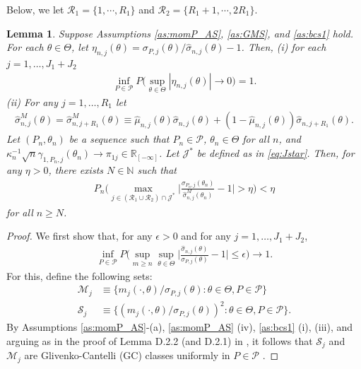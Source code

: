 \documentclass[letterpaper,11pt]{article}
\theoremstyle{myplain}
\newtheorem{lemma}{Lemma}[section]
\theoremstyle{mydefinition}
\theoremstyle{myremark}
\renewcommand{\cite}{\citet}
\newcommand{\R}{\mathbb{R}}
\newcommand{\dsM}{\mathcal{M}}
\newcommand{\gcM}{\mathcal{S}}
\numberwithin{equation}{section}
\numberwithin{figure}{section}
\begin{document}
\begin{appendices}
Below, we let $\mathcal R_1=\{1,\cdots,R_1\}$ and $\mathcal R_2=\{R_1+1,\cdots,2R_1\}.$
\begin{lemma}\label{lem:eta_conv}
	Suppose Assumptions \ref{as:momP_AS}, \ref{as:GMS}, and \ref{as:bcs1} hold. For each $\theta\in\Theta$, let $\eta_{n,j}(\theta)=\sigma_{P,j}(\theta)/\hat\sigma_{n,j}(\theta)-1$. Then, (i) for each $j=1,\dots,J_1+J_2$
\begin{align}
	\inf_{P\in\mathcal P}P
	\Big(\sup_{\theta\in\Theta}|\eta_{n,j}(\theta)|
	\to 0\Big)=1.
\end{align}	
(ii)
For any $j=1,\dots,R_1$ 
let
\begin{align}
\hat \sigma_{n,j}^M(\theta)=\hat \sigma_{n,j+R_1}^M(\theta)\equiv\hat \mu_{n,j}(\theta)\hat\sigma_{n,j}(\theta)+(1-\hat \mu_{n,j}(\theta))\hat\sigma_{n,j+R_1}(\theta). \label{eq:def_hat_sigma_M}
\end{align} 
Let $(P_n,\theta_n)$ be a sequence such that $P_n\in\mathcal P$, $\theta_n\in\Theta$ for all $n$, and $\kappa_n^{-1}\sqrt{n}\gamma_{1,P_n,j}(\theta_n) \to \pi_{1j} \in \R_{[-\infty]}$. Let $\mathcal J^*$ be defined as in \eqref{eq:Jstar}.
Then, for any $\eta>0$, there exists $N\in\mathbb N$ such that
\begin{align}
	P_n\Big(\max_{j\in(\mathcal R_1\cup \mathcal R_2)\cap\mathcal J^*}\Big|\frac{\sigma_{P_n,j}(\theta_n)}{\hat\sigma^M_{n,j}(\theta_n)}-1\Big|>\eta\Big)<\eta
\end{align}
for all  $n\ge N$.





\end{lemma}

\begin{proof}


We first show that, for any $\epsilon>0$ and for any $j=1,\dots,J_1+J_2$,
\begin{align}
\inf_{P\in\mathcal P}P
\Big(\sup_{m\ge n}\sup_{\theta\in\Theta}\Big|\frac{\hat\sigma_{n,j}(\theta)}{\sigma_{P,j}(\theta)}-1\Big|\le \epsilon\Big)\to 1.	\label{eq:ec0}
\end{align}
For this, define the following sets:
	\begin{align}
		\dsM_j&\equiv\{m_j(\cdot,\theta)/\sigma_{P,j}(\theta):\theta\in\Theta,P\in\mathcal P\}\label{eq:ec1}\\
		\gcM_j&\equiv\{(m_j(\cdot,\theta)/\sigma_{P,j}(\theta))^2:\theta\in\Theta,P\in\mathcal P\}.\label{eq:ec2}
	\end{align}
By Assumptions \ref{as:momP_AS}-(a), \ref{as:momP_AS} (iv), \ref{as:bcs1} (i), (iii),  and arguing as in the proof of Lemma D.2.2 (and D.2.1) in \cite{BCS14_misp}, it follows that $\gcM_j$ and $\dsM_j$ are Glivenko-Cantelli (GC) classes uniformly in $P\in\mathcal P$ \citep[in the sense of][page 167]{Vaart_Wellner2000aBK}.   


\end{proof}
\end{appendices}
\end{document}
